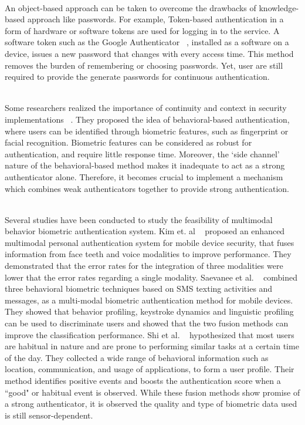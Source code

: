 \documentclass[a4paper, 11pt]{article}
\begin{document}
\noindent\\
An object-based approach can be taken to overcome the drawbacks of knowledge-based approach like passwords. For example, Token-based authentication in a form of hardware or software tokens are used for logging in to the service. A software token such as the Google Authenticator ~\cite{aloul2009two}, installed as a software on a device, issues a new password that changes with every access time. This method removes the burden of remembering or choosing passwords. Yet, user are still required to provide the generate passwords for continuous authentication. 
 
 \noindent\\
Some researchers realized the importance of continuity and context in security implementations ~\cite{Nakanishi:2016:UBC:3015166.3015180, Sitara:2016:DVT:3009206.3009228,https://calhoun.nps.edu/handle/10945/1011,Janakiraman:2005:UCF:1042449.1043974,ebb6df849f174c33bc9df41b799a296d}.
They proposed the idea of behavioral-based authentication, where users can be identified through biometric features, such as fingerprint or facial recognition. Biometric features can be considered as robust for authentication, and require little response time. Moreover, the ‘side channel’ nature of the behavioral-based method makes it inadequate to act as a strong authenticator alone. Therefore, it becomes crucial to implement a mechanism which combines weak authenticators together to provide strong authentication. 

\noindent\\
Several studies have been conducted to study the feasibility of multimodal behavior biometric authentication system. Kim et. al ~\cite{kim2010person} proposed an enhanced multimodal personal authentication system for mobile device security,  that fuses information from face teeth and voice modalities to improve performance. They demonstrated that the error rates for the integration of three modalities were lower that the error rates regarding a single modality. Saevanee et al. ~\cite{saevanee2012multi} combined three behavioral biometric techniques based on SMS texting activities and messages, as a multi-modal biometric authentication method for mobile devices. They showed that behavior profiling, keystroke dynamics and linguistic profiling can be used to discriminate users and showed that the two fusion methods can improve the classification performance.  Shi et al. ~\cite{shi2010implicit} hypothesized that most users are habitual in nature and are prone to performing similar tasks at a certain time of the day. They collected a wide range of behavioral information such as location, communication, and usage of applications, to form a user profile. Their method identifies positive events and boosts the authentication score when a “good" or habitual event is observed. While these fusion methods show promise of a strong authenticator, it is observed the quality and type of biometric data used is still sensor-dependent. 
\end{document}
